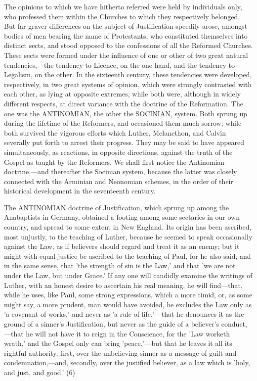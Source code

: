 \documentclass[
]{book}
\begin{document}
The opinions to which we have hitherto referred were held by individuals only, who professed them within the Churches to which they respectively belonged. But far graver differences on the subject of Justification speedily arose, amongst bodies of men bearing the name of Protestants, who constituted themselves into distinct sects, and stood opposed to the confessions of all the Reformed Churches. These sects were formed under the influence of one or other of two great natural tendencies,---the tendency to Licence, on the one hand, and the tendency to Legalism, on the other. In the sixteenth century, these tendencies were developed, respectively, in two great systems of opinion, which were strongly contrasted with each other, as lying at opposite extremes, while both were, although in widely different respects, at direct variance with the doctrine of the Reformation. The one was the ANTINOMIAN, the other the SOCINIAN, system. Both sprung up during the lifetime of the Reformers, and occasioned them much sorrow; while both survived the vigorous efforts which Luther, Melancthon, and Calvin severally put forth to arrest their progress. They may be said to have appeared simultaneously, as reactions, in opposite directions, against the truth of the Gospel as taught by the Reformers. We shall first notice the Antinomian doctrine,---and thereafter the Socinian system, because the latter was closely connected with the Arminian and Neonomian schemes, in the order of their historical development in the seventeenth century.

The ANTINOMIAN doctrine of Justification, which sprung up among the Anabaptists in Germany, obtained a footing among some sectaries in our own country, and spread to some extent in New England. Its origin has been ascribed, most unjustly, to the teaching of Luther, because he seemed to speak occasionally against the Law, as if believers should regard and treat it as an enemy; but it might with equal justice be ascribed to the teaching of Paul, for he also said, and in the same sense, that 'the strength of sin is the Law,' and that 'we are not under the Law, but under Grace.' If any one will candidly examine the writings of Luther, with an honest desire to ascertain his real meaning, he will find---that, while he uses, like Paul, some strong expressions, which a more timid, or, as some might say, a more prudent, man would have avoided, he excludes the Law only as 'a covenant of works,' and never as 'a rule of life,'---that he denounces it as the ground of a sinner's Justification, but never as the guide of a believer's conduct,---that he will not have it to reign in the Conscience, for the 'Law worketh wrath,' and the Gospel only can bring 'peace,'---but that he leaves it all its rightful authority, first, over the unbelieving sinner as a message of guilt and condemnation,---and, secondly, over the justified believer, as a law which is 'holy, and just, and good.' (6)
\end{document}
